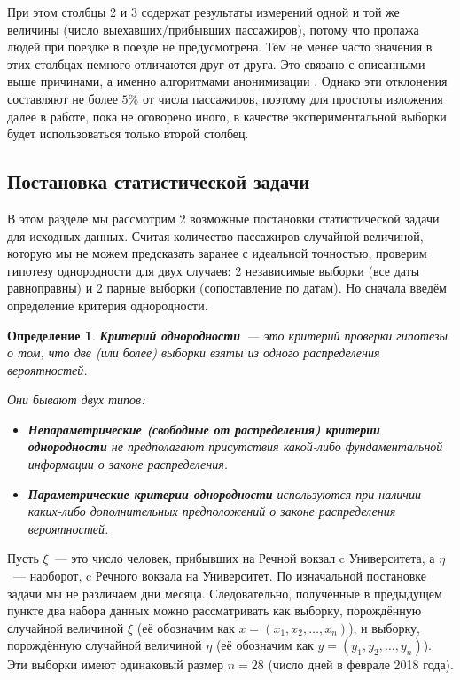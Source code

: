 \documentclass[12pt, fleqn, titlepage]{article}
\newtheorem{Def}{Определение}
\begin{document}
    При этом столбцы 2 и 3 содержат результаты измерений одной и той же величины 
    (число выехавших/прибывших пассажиров), потому что пропажа людей при поездке в поезде не предусмотрена. 
    Тем не менее часто значения в этих столбцах немного отличаются друг от друга. 
    Это связано с описанными выше причинами, а именно алгоритмами анонимизации \cite{niu2015novel}.
    Однако эти отклонения составляют не более $5\%$ от числа пассажиров, поэтому для простоты изложения 
    далее в работе, пока не оговорено иного, в качестве экспериментальной выборки будет использоваться только второй столбец.

    \subsection{Постановка статистической задачи}

    В этом разделе мы рассмотрим 2 возможные постановки статистической задачи для исходных данных. 
    Считая количество пассажиров случайной величиной, которую мы не можем предсказать заранее с идеальной точностью, 
    проверим гипотезу однородности для двух случаев: 2 независимые выборки (все даты равноправны) 
    и 2 парные выборки (сопоставление по датам). Но сначала введём определение критерия однородности.

    \begin{Def}
            {\bf Критерий однородности}~--- это критерий проверки гипотезы о том, что две (или более) 
            выборки взяты из одного распределения вероятностей. 

            Они бывают двух типов:
            \begin{itemize}
            \item {\bf Непараметрические (свободные от распределения) критерии 
            однородности} не предполагают присутствия какой-либо фундаментальной информации о законе распределения. 

            \item {\bf Параметрические критерии однородности} используются при наличии каких-либо дополнительных предположений о законе распределения вероятностей.
            \end{itemize}
    \end{Def}


    Пусть $\xi$~--- это число человек, прибывших на Речной вокзал c Университета, а $\eta$~--- наоборот, 
    c Речного вокзала на Университет. По изначальной постановке задачи мы не различаем дни месяца. 
    Следовательно, полученные в предыдущем пункте два набора данных можно 
    рассматривать как выборку, порождённую случайной величиной $\xi$ (её обозначим как $x = (x_1, x_2, \dots , x_n)$), 
    и выборку, порождённую случайной величиной $\eta$ (её обозначим как $y = (y_1, y_2, \dots , y_n)$). 
    Эти выборки имеют одинаковый размер $n = 28$  (число дней в феврале 2018 года).
\end{document}
